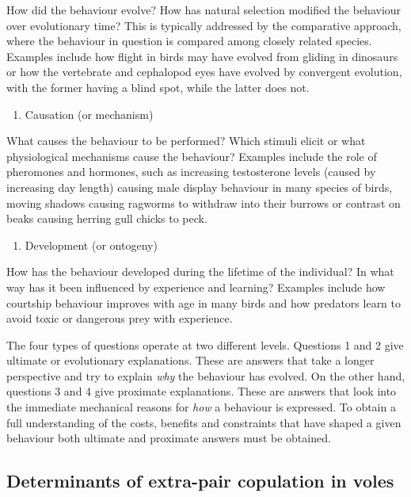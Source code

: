\documentclass[
  letterpaper,
  DIV=11,
  numbers=noendperiod]{scrreprt}
\providecommand{\tightlist}{%
  \setlength{\itemsep}{0pt}\setlength{\parskip}{0pt}}
\begin{document}
How did the behaviour evolve? How has natural selection modified the
behaviour over evolutionary time? This is typically addressed by the
comparative approach, where the behaviour in question is compared among
closely related species. Examples include how flight in birds may have
evolved from gliding in dinosaurs or how the vertebrate and cephalopod
eyes have evolved by convergent evolution, with the former having a
blind spot, while the latter does not.

\begin{enumerate}
\def\labelenumi{\arabic{enumi}.}
\setcounter{enumi}{2}
\tightlist
\item
  Causation (or mechanism)
\end{enumerate}

What causes the behaviour to be performed? Which stimuli elicit or what
physiological mechanisms cause the behaviour? Examples include the role
of pheromones and hormones, such as increasing testosterone levels
(caused by increasing day length) causing male display behaviour in many
species of birds, moving shadows causing ragworms to withdraw into their
burrows or contrast on beaks causing herring gull chicks to peck.

\begin{enumerate}
\def\labelenumi{\arabic{enumi}.}
\setcounter{enumi}{3}
\tightlist
\item
  Development (or ontogeny)
\end{enumerate}

How has the behaviour developed during the lifetime of the individual?
In what way has it been influenced by experience and learning? Examples
include how courtship behaviour improves with age in many birds and how
predators learn to avoid toxic or dangerous prey with experience.

The four types of questions operate at two different levels. Questions 1
and 2 give ultimate or evolutionary explanations. These are answers that
take a longer perspective and try to explain \emph{why} the behaviour
has evolved. On the other hand, questions 3 and 4 give proximate
explanations. These are answers that look into the immediate mechanical
reasons for \emph{how} a behaviour is expressed. To obtain a full
understanding of the costs, benefits and constraints that have shaped a
given behaviour both ultimate and proximate answers must be obtained.

\subsection{Determinants of extra-pair copulation in
voles}\label{determinants-of-extra-pair-copulation-in-voles}
\end{document}
